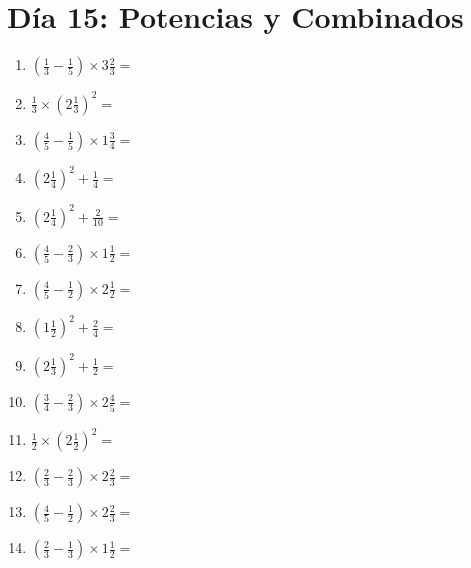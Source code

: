 \documentclass[12pt]{article}
\begin{document}
\section*{Día 15: Potencias y Combinados}
\begin{enumerate}
\item \large $ \left( \frac{1}{3} - \frac{1}{5} \right) \times 3 \frac{2}{3} = $ \vspace{1.6cm}
\item \large $ \frac{1}{3} \times \left( 2 \frac{1}{3} \right)^2 = $ \vspace{1.6cm}
\item \large $ \left( \frac{4}{5} - \frac{1}{5} \right) \times 1 \frac{3}{4} = $ \vspace{1.6cm}
\item \large $ \left( 2 \frac{1}{4} \right)^2 + \frac{1}{4} = $ \vspace{1.6cm}
\item \large $ \left( 2 \frac{1}{4} \right)^2 + \frac{2}{10} = $ \vspace{1.6cm}
\item \large $ \left( \frac{4}{5} - \frac{2}{3} \right) \times 1 \frac{1}{2} = $ \vspace{1.6cm}
\item \large $ \left( \frac{4}{5} - \frac{1}{2} \right) \times 2 \frac{1}{2} = $ \vspace{1.6cm}
\item \large $ \left( 1 \frac{1}{2} \right)^2 + \frac{2}{4} = $ \vspace{1.6cm}
\item \large $ \left( 2 \frac{1}{3} \right)^2 + \frac{1}{2} = $ \vspace{1.6cm}
\item \large $ \left( \frac{3}{4} - \frac{2}{3} \right) \times 2 \frac{4}{5} = $ \vspace{1.6cm}
\newpage
\item \large $ \frac{1}{2} \times \left( 2 \frac{1}{2} \right)^2 = $ \vspace{1.6cm}
\item \large $ \left( \frac{2}{3} - \frac{2}{3} \right) \times 2 \frac{2}{3} = $ \vspace{1.6cm}
\item \large $ \left( \frac{4}{5} - \frac{1}{2} \right) \times 2 \frac{2}{3} = $ \vspace{1.6cm}
\item \large $ \left( \frac{2}{3} - \frac{1}{3} \right) \times 1 \frac{1}{2} = $ \vspace{1.6cm}

\end{enumerate}
\end{document}
